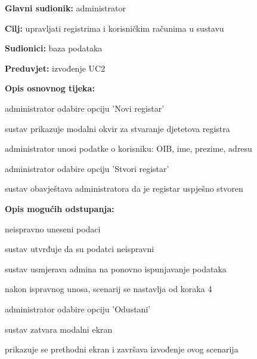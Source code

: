                     \noindent {}
					\begin{packed_item}
	
						\item \textbf{Glavni sudionik: }administrator
						\item  \textbf{Cilj:} upravljati registrima i korisničkim računima u sustavu
						\item  \textbf{Sudionici:} baza podataka
						\item  \textbf{Preduvjet:} izvođenje UC2
						\item  \textbf{Opis osnovnog tijeka:}
						
						\item[] \begin{packed_enum}
	
							\item administrator odabire opciju 'Novi registar'
							\item sustav prikazuje modalni okvir za stvaranje djetetova registra
							\item administrator unosi podatke o korisniku: OIB, ime, prezime, adresu
							\item administrator odabire opciju 'Stvori registar'
							\item sustav obavještava administratora da je registar uspješno stvoren

						\end{packed_enum}

						\item  \textbf{Opis mogućih odstupanja:}
						
						\item[] \begin{packed_item}
                            \item[3.a] neispravno uneseni podaci
                            \item[] \begin{packed_enum}
                            	\item sustav utvrđuje da su podatci neispravni
								\item sustav usmjerava admina na ponovno ispunjavanje podataka
								\item nakon ispravnog unosa, scenarij se nastavlja od koraka 4
							\end{packed_enum}
							\item[3.b] administrator odabire opciju 'Odustani'
							\item[] \begin{packed_enum}
								\item sustav zatvara modalni ekran
								\item prikazuje se prethodni ekran i završava izvođenje ovog scenarija
							\end{packed_enum}
						\end{packed_item}
						
					\end{packed_item}

